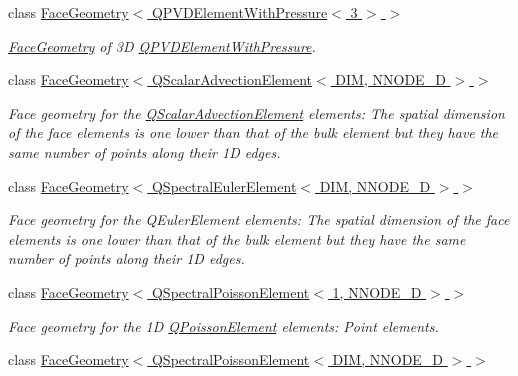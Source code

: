 \begin{DoxyCompactItemize}
class \hyperlink{classoomph_1_1FaceGeometry_3_01QPVDElementWithPressure_3_013_01_4_01_4}{Face\+Geometry$<$ Q\+P\+V\+D\+Element\+With\+Pressure$<$ 3 $>$ $>$}
\begin{DoxyCompactList}\small\item\em \hyperlink{classoomph_1_1FaceGeometry}{Face\+Geometry} of 3D \hyperlink{classoomph_1_1QPVDElementWithPressure}{Q\+P\+V\+D\+Element\+With\+Pressure}. \end{DoxyCompactList}\item 
class \hyperlink{classoomph_1_1FaceGeometry_3_01QScalarAdvectionElement_3_01DIM_00_01NNODE__1D_01_4_01_4}{Face\+Geometry$<$ Q\+Scalar\+Advection\+Element$<$ D\+I\+M, N\+N\+O\+D\+E\+\_\+D $>$ $>$}
\begin{DoxyCompactList}\small\item\em Face geometry for the \hyperlink{classoomph_1_1QScalarAdvectionElement}{Q\+Scalar\+Advection\+Element} elements\+: The spatial dimension of the face elements is one lower than that of the bulk element but they have the same number of points along their 1D edges. \end{DoxyCompactList}\item 
class \hyperlink{classoomph_1_1FaceGeometry_3_01QSpectralEulerElement_3_01DIM_00_01NNODE__1D_01_4_01_4}{Face\+Geometry$<$ Q\+Spectral\+Euler\+Element$<$ D\+I\+M, N\+N\+O\+D\+E\+\_\+D $>$ $>$}
\begin{DoxyCompactList}\small\item\em Face geometry for the Q\+Euler\+Element elements\+: The spatial dimension of the face elements is one lower than that of the bulk element but they have the same number of points along their 1D edges. \end{DoxyCompactList}\item 
class \hyperlink{classoomph_1_1FaceGeometry_3_01QSpectralPoissonElement_3_011_00_01NNODE__1D_01_4_01_4}{Face\+Geometry$<$ Q\+Spectral\+Poisson\+Element$<$ 1, N\+N\+O\+D\+E\+\_\+D $>$ $>$}
\begin{DoxyCompactList}\small\item\em Face geometry for the 1D \hyperlink{classoomph_1_1QPoissonElement}{Q\+Poisson\+Element} elements\+: Point elements. \end{DoxyCompactList}\item 
class \hyperlink{classoomph_1_1FaceGeometry_3_01QSpectralPoissonElement_3_01DIM_00_01NNODE__1D_01_4_01_4}{Face\+Geometry$<$ Q\+Spectral\+Poisson\+Element$<$ D\+I\+M, N\+N\+O\+D\+E\+\_\+D $>$ $>$}
\item 

\end{DoxyCompactItemize}
